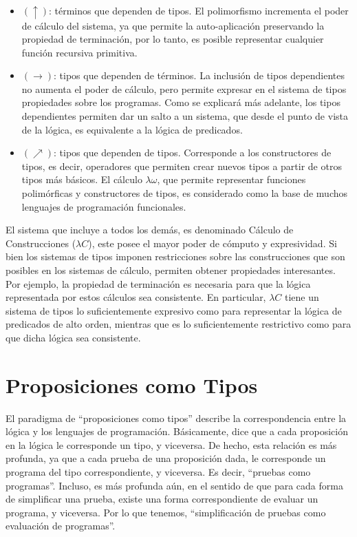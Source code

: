 \begin{itemize}
	\item $(\uparrow)$: términos que dependen de tipos.
	El polimorfismo incrementa el poder de cálculo del sistema, ya que permite la auto-aplicación preservando la propiedad de terminación, por lo tanto, es posible representar cualquier función recursiva primitiva.
	\item $(\rightarrow)$: tipos que dependen de términos.
	La inclusión de tipos dependientes no aumenta el poder de cálculo, pero permite expresar en el sistema de tipos propiedades sobre los programas.
	Como se explicará más adelante, los tipos dependientes permiten dar un salto a un sistema, que desde el punto de vista de la lógica, es equivalente a la lógica de predicados.
	\item $(\nearrow)$: tipos que dependen de tipos.
	Corresponde a los constructores de tipos, es decir, operadores que permiten crear nuevos tipos a partir de otros tipos más básicos.
	El cálculo $\lambda\omega$, que permite representar funciones polimórficas y constructores de tipos, es considerado como la base de muchos lenguajes de programación funcionales.
\end{itemize}

El sistema que incluye a todos los demás, es denominado Cálculo de Construcciones ($\lambda C$), este posee el mayor poder de cómputo y expresividad.
Si bien los sistemas de tipos imponen restricciones sobre las construcciones que son posibles en los sistemas de cálculo, permiten obtener propiedades interesantes.
Por ejemplo, la propiedad de terminación es necesaria para que la lógica representada por estos cálculos sea consistente.
En particular, $\lambda C$ tiene un sistema de tipos lo suficientemente expresivo como para representar la lógica de predicados de alto orden, mientras que es lo suficientemente restrictivo como para que dicha lógica sea consistente.


\section{Proposiciones como Tipos}
El paradigma de ``proposiciones como tipos'' describe la correspondencia entre la lógica y los lenguajes de programación.
Básicamente, dice que a cada proposición en la lógica le corresponde un tipo, y viceversa.
De hecho, esta relación es más profunda, ya que a cada prueba de una proposición dada, le corresponde un programa del tipo correspondiente, y viceversa.
Es decir, ``pruebas como programas''.
Incluso, es más profunda aún, en el sentido de que para cada forma de simplificar una prueba, existe una forma correspondiente de evaluar un programa, y viceversa.
Por lo que tenemos, ``simplificación de pruebas como evaluación de programas''.

